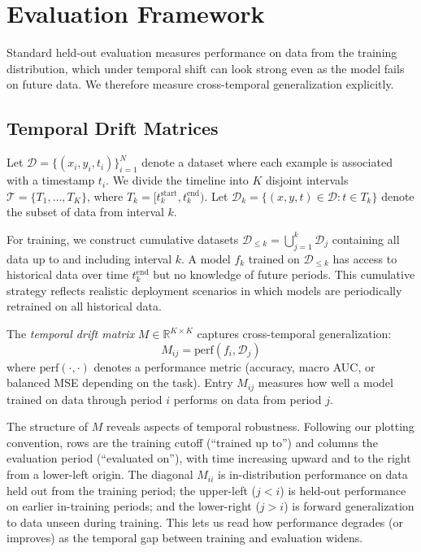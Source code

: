 \section{Evaluation Framework}
\label{section:evaluation_framework}

Standard held-out evaluation measures performance on data from the training distribution, which under temporal shift can look strong even as the model fails on future data. We therefore measure cross-temporal generalization explicitly.

\subsection{Temporal Drift Matrices}

Let $\mathcal{D} = \{(x_i, y_i, t_i)\}_{i=1}^{N}$ denote a dataset where each example is associated with a timestamp $t_i$. We divide the timeline into $K$ disjoint intervals $\mathcal{T} = \{T_1, \ldots, T_K\}$, where $T_k = [t_k^{\text{start}}, t_k^{\text{end}})$. Let $\mathcal{D}_k = \{(x, y, t) \in \mathcal{D} : t \in T_k\}$ denote the subset of data from interval $k$.

For training, we construct cumulative datasets $\mathcal{D}_{\leq k} = \bigcup_{j=1}^{k} \mathcal{D}_j$ containing all data up to and including interval $k$. A model $f_k$ trained on $\mathcal{D}_{\leq k}$ has access to historical data over time $t_k^{\text{end}}$ but no knowledge of future periods. This cumulative strategy reflects realistic deployment scenarios in which models are periodically retrained on all historical data.

The \textit{temporal drift matrix} $M \in \mathbb{R}^{K \times K}$ captures cross-temporal generalization:
\begin{equation}
    M_{ij} = \text{perf}(f_i, \mathcal{D}_j)
\end{equation}
where $\text{perf}(\cdot, \cdot)$ denotes a performance metric (accuracy, macro AUC, or balanced MSE depending on the task). Entry $M_{ij}$ measures how well a model trained on data through period $i$ performs on data from period $j$.

\iflncs\noindent\fi The structure of $M$ reveals aspects of temporal robustness. Following our plotting convention, rows are the training cutoff (``trained up to'') and columns the evaluation period (``evaluated on''), with time increasing upward and to the right from a lower-left origin. The diagonal $M_{ii}$ is in-distribution performance on data held out from the training period; the upper-left ($j < i$) is held-out performance on earlier in-training periods; and the lower-right ($j > i$) is forward generalization to data unseen during training. This lets us read how performance degrades (or improves) as the temporal gap between training and evaluation widens.

